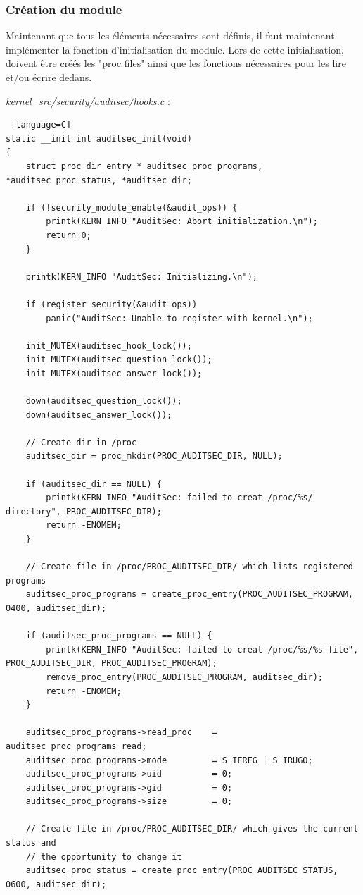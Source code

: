 \documentclass[pdftex,a4paper,titlepage,11pt]{article}
\begin{document}
\subsubsection{Création du module}

Maintenant que tous les éléments nécessaires sont définis, il faut maintenant implémenter la fonction d'initialisation du module. Lors de cette initialisation, doivent être créés les "proc files" ainsi que les fonctions nécessaires pour les lire et/ou écrire dedans.

\textit{{kernel\_src}/security/auditsec/hooks.c} :
\begin{lstlisting} [language=C]
static __init int auditsec_init(void)
{
	struct proc_dir_entry * auditsec_proc_programs, *auditsec_proc_status, *auditsec_dir;

	if (!security_module_enable(&audit_ops)) {
		printk(KERN_INFO "AuditSec: Abort initialization.\n");
		return 0;
	}

	printk(KERN_INFO "AuditSec: Initializing.\n");

	if (register_security(&audit_ops))
		panic("AuditSec: Unable to register with kernel.\n");

	init_MUTEX(auditsec_hook_lock());
	init_MUTEX(auditsec_question_lock());
	init_MUTEX(auditsec_answer_lock());

	down(auditsec_question_lock());
	down(auditsec_answer_lock());

	// Create dir in /proc
	auditsec_dir = proc_mkdir(PROC_AUDITSEC_DIR, NULL);

	if (auditsec_dir == NULL) {
		printk(KERN_INFO "AuditSec: failed to creat /proc/%s/ directory", PROC_AUDITSEC_DIR);
		return -ENOMEM;
	}

	// Create file in /proc/PROC_AUDITSEC_DIR/ which lists registered programs
	auditsec_proc_programs = create_proc_entry(PROC_AUDITSEC_PROGRAM, 0400, auditsec_dir);

	if (auditsec_proc_programs == NULL) {
		printk(KERN_INFO "AuditSec: failed to creat /proc/%s/%s file", PROC_AUDITSEC_DIR, PROC_AUDITSEC_PROGRAM);
		remove_proc_entry(PROC_AUDITSEC_PROGRAM, auditsec_dir);
		return -ENOMEM;
	}

	auditsec_proc_programs->read_proc    = auditsec_proc_programs_read;
	auditsec_proc_programs->mode         = S_IFREG | S_IRUGO;
	auditsec_proc_programs->uid          = 0;
	auditsec_proc_programs->gid          = 0;
	auditsec_proc_programs->size         = 0;

	// Create file in /proc/PROC_AUDITSEC_DIR/ which gives the current status and
	// the opportunity to change it
	auditsec_proc_status = create_proc_entry(PROC_AUDITSEC_STATUS, 0600, auditsec_dir);


\end{lstlisting}
\end{document}
